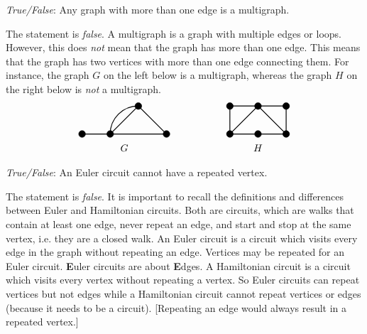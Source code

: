 \documentclass[11pt,letterpaper]{article}
\begin{document}
\quizsol \textit{True/False}: Any graph with more than one edge is a multigraph. \pspace

\sol The statement is \textit{false}. A multigraph is a graph with multiple edges or loops. However, this does \textit{not} mean that the graph has more than one edge. This means that the graph has two vertices with more than one edge connecting them. For instance, the graph $G$ on the left below is a multigraph, whereas the graph $H$ on the right below is \textit{not} a multigraph. 
	\[
	\begin{tikzpicture}
	\draw[line width=0.03cm] (0,0) -- (1,0) -- (2,1) -- (3,0) -- (1,0);
	\draw[line width=0.03cm] (1,0) to[out=90, in= 180] (2,1);
	
	\draw[fill=black] (0,0) circle (0.12);
	\draw[fill=black] (1,0) circle (0.12);
	\draw[fill=black] (2,1) circle (0.12);
	\draw[fill=black] (3,0) circle (0.12);
	
	\node at (1.5,-0.5) {$G$};
	\end{tikzpicture} \hspace{2cm}
	\begin{tikzpicture}
	\draw[line width=0.03cm] (0,0) -- (2,0) -- (2,1) -- (0,1) -- (0,0);
	\draw[line width=0.03cm] (0,0) -- (1,1) -- (2,0);
	
	\draw[fill=black] (0,0) circle (0.12);
	\draw[fill=black] (1,0) circle (0.12);
	\draw[fill=black] (2,0) circle (0.12);
	\draw[fill=black] (0,1) circle (0.12);
	\draw[fill=black] (1,1) circle (0.12);
	\draw[fill=black] (2,1) circle (0.12);
	
	\node at (1,-0.5) {$H$};
	\end{tikzpicture}
	\] \pvspace{0.8cm}



\quizsol \textit{True/False}: An Euler circuit cannot have a repeated vertex. \pspace

\sol The statement is \textit{false}. It is important to recall the definitions and differences between Euler and Hamiltonian circuits. Both are circuits, which are walks that contain at least one edge, never repeat an edge, and start and stop at the same vertex, i.e. they are a closed walk. An Euler circuit is a circuit which visits every edge in the graph without repeating an edge. Vertices may be repeated for an Euler circuit. \textbf{E}uler circuits are about \textbf{E}dges. A Hamiltonian circuit is a circuit which visits every vertex without repeating a vertex. So Euler circuits can repeat vertices but not edges while a Hamiltonian circuit cannot repeat vertices or edges (because it needs to be a circuit). [Repeating an edge would always result in a repeated vertex.] \pvspace{0.8cm}
\end{document}
